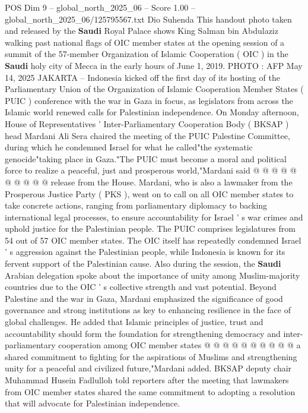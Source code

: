 \begin{textsample}{POS Dim 9 – global\_north\_2025\_06 – Score 1.00 – global\_north\_2025\_06/125795567.txt}  \label{ex:f9_pos_348}
Dio Suhenda This handout photo taken and released by the \textbf{Saudi} Royal Palace shows King Salman bin Abdulaziz walking past national flags of OIC member states at the opening session of a summit of the 57-member Organization of Islamic Cooperation ( OIC ) in the \textbf{Saudi} holy city of Mecca in the early hours of June 1, 2019.
PHOTO : AFP May 14, 2025 JAKARTA -- Indonesia kicked off the first day of its hosting of the Parliamentary Union of the Organization of Islamic Cooperation Member States ( PUIC ) conference with the war in Gaza in focus, as legislators from across the Islamic world renewed calls for Palestinian independence.
On Monday afternoon, House of Representatives ' Inter-Parliamentary Cooperation Body ( BKSAP ) head Mardani Ali Sera chaired the meeting of the PUIC Palestine Committee, during which he condemned Israel for what he called"the systematic genocide"taking place in Gaza."The PUIC must become a moral and political force to realize a peaceful, just and prosperous world,"Mardani said @ @ @ @ @ @ @ @ @ @ release from the House.
Mardani, who is also a lawmaker from the Prosperous Justice Party ( PKS ), went on to call on all OIC member states to take concrete actions, ranging from parliamentary diplomacy to backing international legal processes, to ensure accountability for Israel ' s war crimes and uphold justice for the Palestinian people.
The PUIC comprises legislatures from 54 out of 57 OIC member states.
The OIC itself has repeatedly condemned Israel ' s aggression against the Palestinian people, while Indonesia is known for its fervent support of the Palestinian cause.
Also during the session, the \textbf{Saudi} Arabian delegation spoke about the importance of unity among Muslim-majority countries due to the OIC ' s collective strength and vast potential.
Beyond Palestine and the war in Gaza, Mardani emphasized the significance of good governance and strong institutions as key to enhancing resilience in the face of global challenges.
He added that Islamic principles of justice, trust and accountability should form the foundation for strengthening democracy and inter-parliamentary cooperation among OIC member states @ @ @ @ @ @ @ @ @ @ a shared commitment to fighting for the aspirations of Muslims and strengthening unity for a peaceful and civilized future,"Mardani added.
BKSAP deputy chair Muhammad Husein Fadlulloh told reporters after the meeting that lawmakers from OIC member states shared the same commitment to adopting a resolution that will advocate for Palestinian independence.

\end{textsample}
